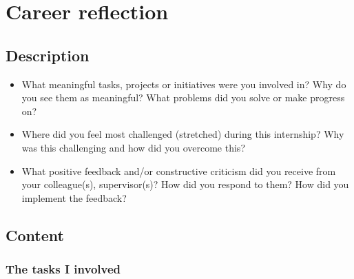 \newpage
\section{Career reflection}

\subsection{Description}
\begin{itemize}
    \item What meaningful tasks, projects or initiatives were you involved in? Why do you see them as meaningful?  What problems did you solve or make progress on?
    \item Where did you feel most challenged (stretched) during this internship? Why was this challenging and how did you overcome this?
    \item What positive feedback and/or constructive criticism did you receive from your colleague(s), supervisor(s)? How did you respond to them? How did you implement the feedback?
\end{itemize}

\subsection{Content}

\subsubsection{The tasks I involved}

